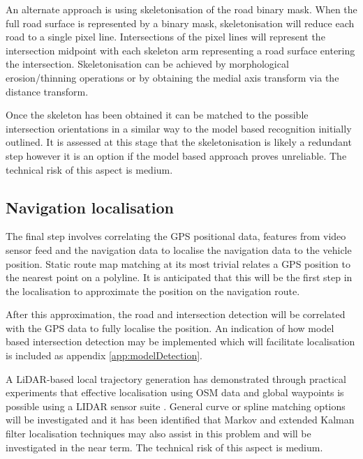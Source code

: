 \documentclass[]{aiaa-tc}%
\begin{document}
An alternate approach is using skeletonisation of the road binary mask. When the full road surface is represented by a binary mask, skeletonisation will reduce each road to a single pixel line. Intersections of the pixel lines will represent the intersection midpoint with each skeleton arm representing a road surface entering the intersection. Skeletonisation can be achieved by morphological erosion/thinning operations or by obtaining the medial axis transform via the distance transform.

Once the skeleton has been obtained it can be matched to the possible intersection orientations in a similar way to the model based recognition initially outlined. It is assessed at this stage that the skeletonisation is likely a redundant step however it is an option if the model based approach proves unreliable. The technical risk of this aspect is medium.


\subsection{Navigation localisation}

The final step involves correlating the GPS positional data, features from video sensor feed and the navigation data to localise the navigation data to the vehicle position. Static route map matching at its most trivial relates a GPS position to the nearest point on a polyline. It is anticipated that this will be the first step in the localisation to approximate the position on the navigation route. 

After this approximation, the road and intersection detection will be correlated with the GPS data to fully localise the position. An indication of how model based intersection detection \citep{modelBasedIntersection} may be implemented which will facilitate localisation is included as appendix \ref{app:modelDetection}.


A LiDAR-based local trajectory generation has demonstrated through practical experiments that effective localisation using OSM data and global waypoints is possible using a LIDAR sensor suite \cite{mitLocalNavDriving}. General curve or spline matching options will be investigated and it has been identified that Markov and extended Kalman filter localisation techniques may also assist in this problem \citep{probabalisticRobotics} and will be investigated in the near term. The technical risk of this aspect is medium.
\end{document}
